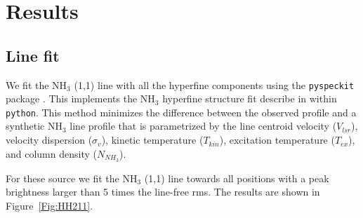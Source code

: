 \section{Results}

\subsection{Line fit}
We fit the NH$_3$ (1,1) line with all the hyperfine components using the \verb+pyspeckit+ package \cite{2011ascl.soft09001G}. 
This implements the NH$_3$ hyperfine structure fit describe in \cite{Rosolowsky_2008} within \verb+python+.
This method minimizes the difference between the observed profile and a synthetic NH$_3$ line profile 
that is parametrized by the line centroid velocity ($V_{lsr}$), velocity dispersion ($\sigma_v$), 
kinetic temperature ($T_{kin}$), excitation temperature ($T_{ex}$), and column density ($N_{NH_3}$).

For these source we fit the NH$_3$ (1,1) line towards all positions with a peak brightness larger than
5 times the line-free rms. The results are shown in Figure~\ref{Fig:HH211}.